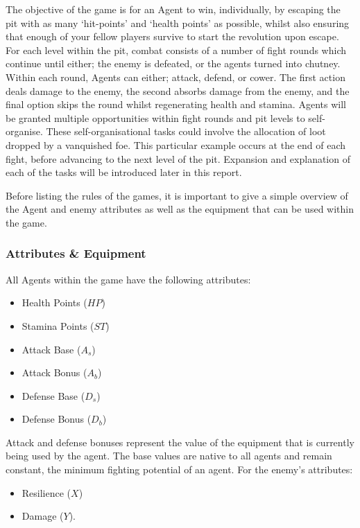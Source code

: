 The objective of the game is for an Agent to win, individually, by escaping the pit with as many `hit-points' and `health points' as possible, whilst also ensuring that enough of your fellow players survive to start the revolution upon escape. 
For each level within the pit, combat consists of a number of fight rounds which continue until either; the enemy is defeated, or the agents turned into chutney. Within each round, Agents can either; attack, defend, or cower. The first action deals damage to the enemy, the second absorbs damage from the enemy, and the final option skips the round whilst regenerating health and stamina.
Agents will be granted multiple opportunities within fight rounds and pit levels to self-organise. These self-organisational tasks could involve the allocation of loot dropped by a vanquished foe. This particular example occurs at the end of each fight, before advancing to the next level of the pit. Expansion and explanation of each of the tasks will be introduced later in this report. 

Before listing the rules of the games, it is important to give a simple overview of the Agent and enemy attributes as well as the equipment that can be used within the game.  

\subsubsection{Attributes \& Equipment}

All Agents within the game have the following attributes:

\begin{itemize} 
    \item Health Points ($HP$)
    \item Stamina Points ($ST$)
    \item Attack Base ($A_s$)
    \item Attack Bonus ($A_b$)
    \item Defense Base ($D_s$)
    \item Defense Bonus ($D_b$)
\end{itemize}

Attack and defense bonuses represent the value of the equipment that is currently being used by the agent. The base values are native to all agents and remain constant, the minimum fighting potential of an agent. For the enemy's attributes:

\begin{itemize}
    \item Resilience ($X$)
    \item Damage ($Y$).
\end{itemize}

